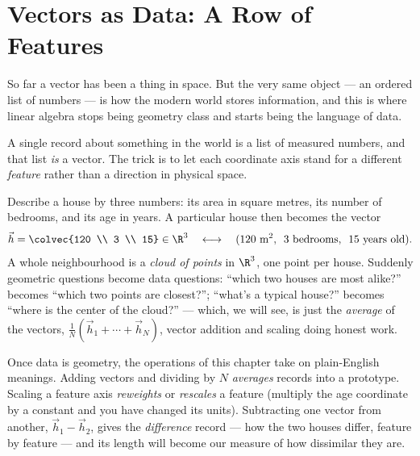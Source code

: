 \section{Vectors as Data: A Row of Features}
\label{ch02:data}

So far a vector has been a thing in space. But the very same object --- an ordered list of
numbers --- is how the modern world stores information, and this is where linear algebra
stops being geometry class and starts being the language of data.

A single record about something in the world is a list of measured numbers, and that list
\emph{is} a vector. The trick is to let each coordinate axis stand for a different
\emph{feature} rather than a direction in physical space.

\begin{example}
\label{ch02:ex-house}
Describe a house by three numbers: its area in square metres, its number of bedrooms, and
its age in years. A particular house then becomes the vector
\[
  \vec{h} = \colvec{120 \\ 3 \\ 15} \in \R^3
  \quad\longleftrightarrow\quad
  \text{(120 m\textsuperscript{2}, \ 3 bedrooms, \ 15 years old)}.
\]
A whole neighbourhood is a \emph{cloud of points} in $\R^3$, one point per house. Suddenly
geometric questions become data questions: ``which two houses are most alike?'' becomes
``which two points are closest?''; ``what's a typical house?'' becomes ``where is the
center of the cloud?'' --- which, we will see, is just the \emph{average} of the vectors,
$\frac{1}{N}(\vec{h}_1 + \cdots + \vec{h}_N)$, vector addition and scaling doing honest
work.
\end{example}

Once data is geometry, the operations of this chapter take on plain-English meanings.
Adding vectors and dividing by $N$ \emph{averages} records into a prototype. Scaling a
feature axis \emph{reweights} or \emph{rescales} a feature (multiply the age coordinate by
a constant and you have changed its units). Subtracting one vector from another,
$\vec{h}_1 - \vec{h}_2$, gives the \emph{difference} record --- how the two houses differ,
feature by feature --- and its length will become our measure of how dissimilar they are.

